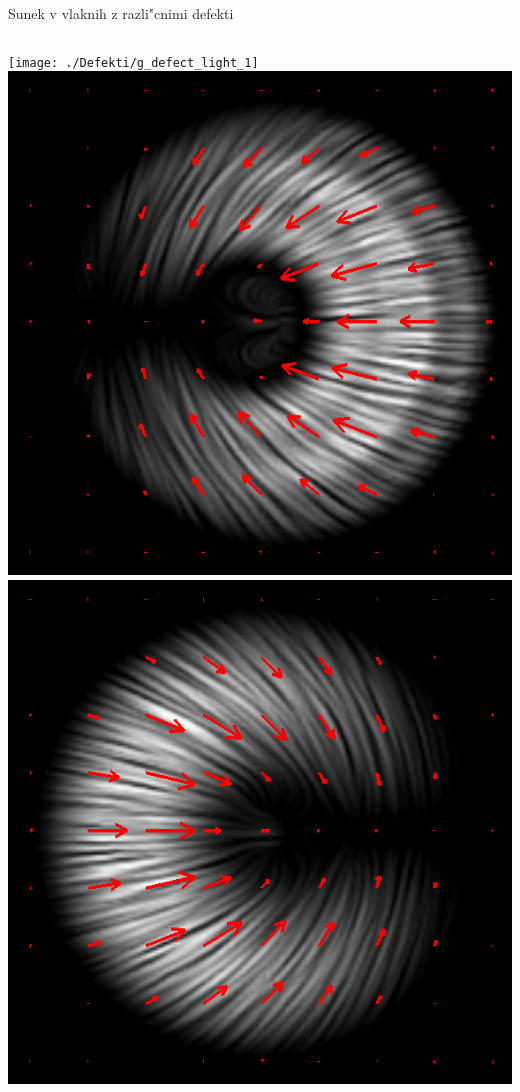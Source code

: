 \documentclass{beamer}
\begin{document}
\begin{frame}{Sunek v vlaknih z razli"cnimi defekti}
\begin{columns}
\centering
  \texttt{[image: ./Defekti/g\_defect\_light\_1]} \\[2mm]
  \includegraphics[width=\textwidth]{./Slike/licp_p12_68} \\[2mm]
  \includegraphics[width=\textwidth]{./Slike/licp_p12_78}
    

\end{columns}
\end{frame}
\end{document}
